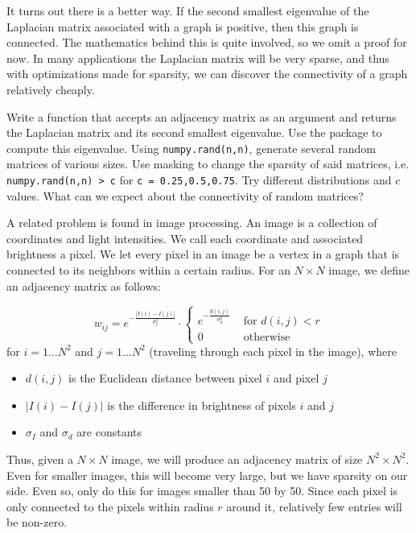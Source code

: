 It turns out there is a better way.
If the second smallest eigenvalue of the Laplacian matrix associated with a graph is positive, then this graph is connected.
The mathematics behind this is quite involved, so we omit a proof for now.
In many applications the Laplacian matrix will be very sparse, and thus with optimizations made for sparsity, we can discover the connectivity of a graph relatively cheaply.

\begin{problem}Write a function  that accepts an adjacency matrix as an argument and returns the Laplacian matrix and its second smallest eigenvalue.
Use the  package to compute this eigenvalue.
Using {\tt numpy.rand(n,n)}, generate several random matrices of various sizes.
Use masking to change the sparsity of said matrices, i.e. {\tt numpy.rand(n,n) > c} for {\tt c = 0.25,0.5,0.75}.
Try different distributions and $c$ values.
What can we expect about the connectivity of random matrices?
\end{problem}

A related problem is found in image processing.
An image is a collection of coordinates and light intensities.
We call each coordinate and associated brightness a pixel.
We let every pixel in an image be a vertex in a graph that is connected to its neighbors within a certain radius.
For an $N \times N$ image, we define an adjacency matrix as follows:

\begin{equation}
\label{eq:adjacency}
w_{ij} = e^{-\frac{|I(i) - I(j)|}{\sigma_I^2}} \cdot \begin{cases} e^{-\frac{d(i,j)}{\sigma_d^2}} & \mbox{ for $d(i,j) < r$} \\ 0 & \mbox{ otherwise} \end{cases}
\end{equation}
for $i = 1 \hdots N^2$ and $j = 1 \hdots N^2$ (traveling through each pixel in the image), where
\begin{itemize}
	\item$d(i,j)$ is the Euclidean distance between pixel $i$ and pixel $j$
	\item $|I(i) - I(j)|$ is the difference in brightness of pixels $i$ and $j$
	\item $\sigma_I$ and $\sigma_d$ are constants
\end{itemize}
Thus, given a $N\times N$ image, we will produce an adjacency matrix of size $N^2\times N^2$.
Even for smaller images, this will become very large, but we have sparsity on our side.
Even so, only do this for images smaller than 50 by 50.
Since each pixel is only connected to the pixels within radius $r$ around it, relatively few entries will be non-zero.

